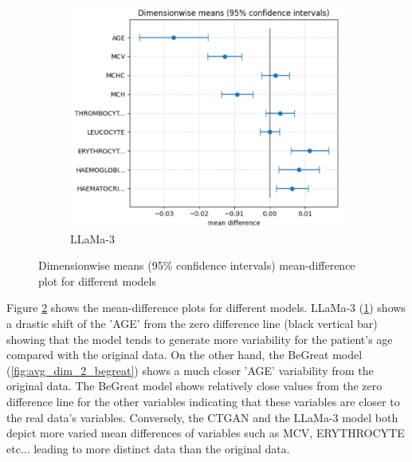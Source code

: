 \begin{figure}[H]
    \hfill
    \begin{subfigure}[b]{0.48\textwidth}
        \centering
        \includegraphics[width=\textwidth]{images/avg_dim_2_llama.png}
        \caption{LLaMa-3}
        \label{fig:avg_dim_2_llama}
    \end{subfigure}
    \caption{Dimensionwise means (95\% confidence intervals) mean-difference plot for different models}
    \label{fig:dim_means_distrib_2}
\end{figure}


Figure \ref{fig:dim_means_distrib_2} shows the mean-difference plots for different models. LLaMa-3 (\ref{fig:avg_dim_2_llama}) shows a drastic shift of the 'AGE' from the zero difference line (black vertical bar) showing that the model tends to generate more variability for the patient's age compared with the original data. On the other hand, the BeGreat model (\ref{fig:avg_dim_2_begreat}) shows a much closer 'AGE' variability from the original data. 
The BeGreat model shows relatively close values from the zero difference line for the other variables indicating that these variables are closer to the real data's variables. Conversely, the CTGAN and the LLaMa-3 model both depict more varied mean differences of variables such as MCV, ERYTHROCYTE etc... leading to more distinct data than the original data. 




